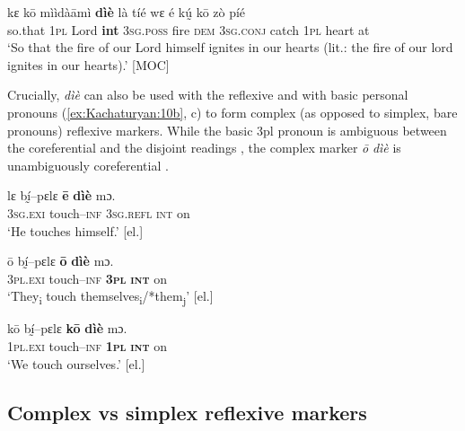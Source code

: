 \documentclass[output=paper]{langscibook}
\begin{document}
\ea
    \label{ex:Kachaturyan:9} 
 \gll kɛ  kō  mììdàāmì  \textbf{dìè}  là  tíé  wɛ  é  kṵ́  kō  zò  píé\\
     so.that  \textsc{1pl}  Lord\textbf{  \textbf{int}}  \textsc{3sg.poss}  fire  \textsc{dem}  \textsc{3sg.conj}  catch  \textsc{1pl}  heart  at  \\
\glt ‘So that the fire of our Lord himself ignites in our hearts (lit.: the fire of our lord ignites in our hearts).’ [MOC]
\z

Crucially, \textit{dìè} can also be used with the reflexive  and with basic personal pronouns (\ref{ex:Kachaturyan:10b}, c) to form complex (as opposed to simplex, bare pronouns) reflexive markers. While the basic 3pl pronoun is ambiguous between the coreferential and the disjoint readings , the complex marker \textit{ō} \textit{dìè} is unambiguously coreferential .


 
 \ea
    \label{ex:Kachaturyan:10} 
     \ea
    \label{ex:Kachaturyan:10a} 
\gll lɛ  bḭ́–pɛlɛ  \textbf{ē}  \textbf{dìè}  mɔ.\\
     \textsc{3sg.exi}  touch–\textsc{inf}  \textsc{3sg.refl}  \textsc{int}  on\\
\glt ‘He touches himself.’ [el.]

\ex 
\label{ex:Kachaturyan:10b}
\gll ō  bḭ́–pɛlɛ  \textbf{ō}  \textbf{dìè}  mɔ.\\
     \textsc{3pl.exi}  touch–\textsc{inf}  \textbf{\textsc{3pl}}  \textbf{\textsc{int}}  on\\
      \glt ‘They\textsubscript{i} touch themselves\textsubscript{i}/*them\textsubscript{j}’ [el.]

 \ex
\label{ex:Kachaturyan:10c}
\gll kō  bḭ́–pɛlɛ  \textbf{kō}  \textbf{dìè}  mɔ.\\
     \textsc{1pl.exi}  touch–\textsc{inf}  \textbf{\textsc{1pl}}  \textbf{\textsc{int}}  on\\
    \glt ‘We touch ourselves.’ [el.]\\
     \z
\z

 
 \subsection{Complex vs simplex reflexive markers}
\end{document}
